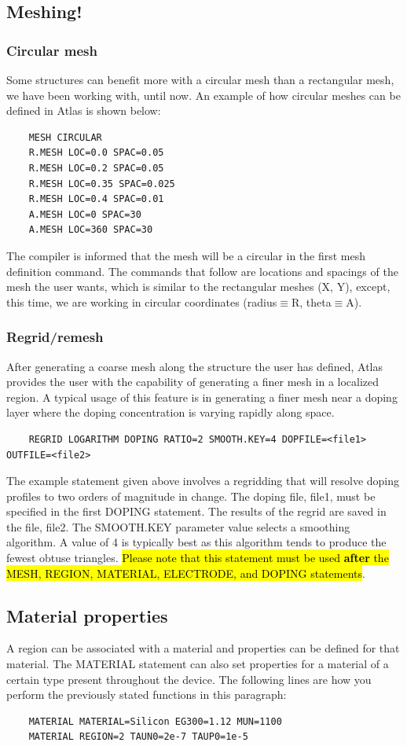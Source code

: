 \documentclass[11pt]{article}
\newcommand{\hlgreen}[1]{{\sethlcolor{green2}\hl{#1}}}
\begin{document}
\subsection{Meshing!}

\subsubsection{Circular mesh}
Some structures can benefit more with a circular mesh than a rectangular mesh, we have been working with, until now. An example of how circular meshes can be defined in Atlas is shown below:
\begin{verbatim}
    MESH CIRCULAR
    R.MESH LOC=0.0 SPAC=0.05
    R.MESH LOC=0.2 SPAC=0.05
    R.MESH LOC=0.35 SPAC=0.025
    R.MESH LOC=0.4 SPAC=0.01
    A.MESH LOC=0 SPAC=30
    A.MESH LOC=360 SPAC=30
\end{verbatim}
The compiler is informed that the mesh will be a circular in the first mesh definition command. The commands that follow are locations and spacings of the mesh the user wants, which is similar to the rectangular meshes (X, Y), except, this time, we are working in circular coordinates (radius$\equiv$R, theta$\equiv$A).

\subsubsection{Regrid/remesh}
After generating a coarse mesh along the structure the user has defined, Atlas provides the user with the capability of generating a finer mesh in a localized region. A typical usage of this feature is in generating a finer mesh near a doping layer where the doping concentration is varying rapidly along space. 
\begin{verbatim}
    REGRID LOGARITHM DOPING RATIO=2 SMOOTH.KEY=4 DOPFILE=<file1> OUTFILE=<file2>
\end{verbatim}
The example statement given above involves a regridding that will resolve doping profiles to two orders of magnitude in change. The doping file, file1, must be specified in the first DOPING statement. The results of the regrid are saved in the file, file2. The SMOOTH.KEY parameter value selects a smoothing algorithm. A value of 4 is typically best as this algorithm tends to produce the fewest obtuse triangles.
\hlgreen{Please note that this statement must be used \textbf{after} the MESH, REGION, MATERIAL, ELECTRODE, and DOPING statements}.

\subsection{Material properties}
A region can be associated with a material and properties can be defined for that material. The MATERIAL statement can also set properties for a material of a certain type present throughout the device. The following lines are how you perform the previously stated functions in this paragraph:
\begin{verbatim}
    MATERIAL MATERIAL=Silicon EG300=1.12 MUN=1100
    MATERIAL REGION=2 TAUN0=2e-7 TAUP0=1e-5
\end{verbatim}
\end{document}
